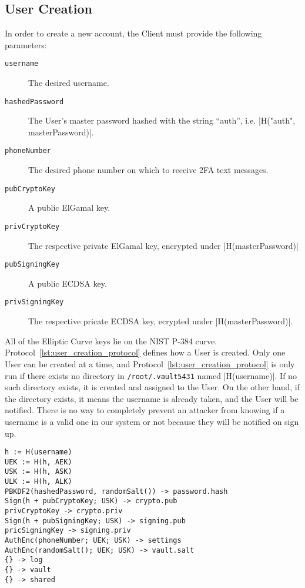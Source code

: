 \documentclass{article}
\begin{document}
\subsection{User Creation}
\label{sub:user_creation}
\par In order to create a new account, the Client must provide the following parameters:
\begin{description}
  \item[\texttt{username}] The desired username.
  \item[\texttt{hashedPassword}] The User's master password hashed with the string ``auth'', i.e. |H("auth", masterPassword)|.
  \item[\texttt{phoneNumber}] The desired phone number on which to receive 2FA text messages.
  \item[\texttt{pubCryptoKey}] A public ElGamal key.
  \item[\texttt{privCryptoKey}] The respective private ElGamal key, encrypted under |H(masterPassword)|
  \item[\texttt{pubSigningKey}] A public ECDSA key.
  \item[\texttt{privSigningKey}] The respective pricate ECDSA key, ecrypted under |H(masterPassword)|.
\end{description}
\par All of the Elliptic Curve keys lie on the NIST P-384 curve. Protocol~\ref{lst:user_creation_protocol} defines how a User is created. Only one User can be created at a time, and Protocol~\ref{lst:user_creation_protocol} is only run if there exists no directory in \texttt{/root/.vault5431} named |H(username)|. If no such directory exists, it is created and assigned to the User. On the other hand, if the directory exists, it means the username is already taken, and the User will be notified. There is no way to completely prevent an attacker from knowing if a username is a valid one in our system or not because they will be notified on sign up.
\begin{lstlisting}[caption={User Creation Protocol},label={lst:user_creation_protocol},style=Pseudocode]
h := H(username)
UEK := H(h, AEK)
USK := H(h, ASK)
ULK := H(h, ALK)
PBKDF2(hashedPassword, randomSalt()) -> password.hash
Sign(h + pubCryptoKey; USK) -> crypto.pub
privCryptoKey -> crypto.priv
Sign(h + pubSigningKey; USK) -> signing.pub
pricSigningKey -> signing.priv
AuthEnc(phoneNumber; UEK; USK) -> settings
AuthEnc(randomSalt(); UEK; USK) -> vault.salt
{} -> log
{} -> vault
{} -> shared
\end{lstlisting}
\end{document}
